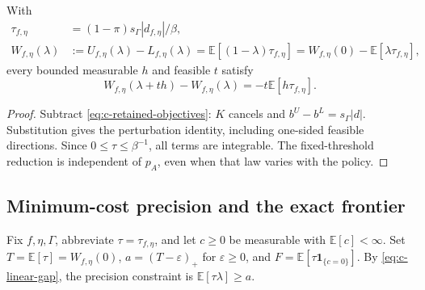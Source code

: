 \begin{proposition}\label{prop:c-tiv}
With
\begin{align}
 \tau_{f,\eta}&=(1-\pi)s_\Gamma|d_{f,\eta}|/\beta,
 \label{eq:c-tiv}\\
 W_{f,\eta}(\lambda)&:=U_{f,\eta}(\lambda)-L_{f,\eta}(\lambda)
 =\mathbb E[(1-\lambda)\tau_{f,\eta}]
 =W_{f,\eta}(0)-\mathbb E[\lambda\tau_{f,\eta}],
 \label{eq:c-linear-gap}
\end{align}
every bounded measurable $h$ and feasible $t$ satisfy
\begin{equation}
 W_{f,\eta}(\lambda+th)-W_{f,\eta}(\lambda)
 =-t\mathbb E[h\tau_{f,\eta}].\label{eq:c-feasible-derivative}
\end{equation}
\end{proposition}
\begin{proof}
Subtract \eqref{eq:c-retained-objectives}: $K$ cancels and
$b^U-b^L=s_\Gamma|d|$. Substitution gives the perturbation identity, including
one-sided feasible directions. Since $0\leq\tau\leq\beta^{-1}$, all terms are
integrable. The fixed-threshold reduction is independent of $p_A$, even when
that law varies with the policy.
\end{proof}

\subsection{Minimum-cost precision and the exact frontier}
\label{app:frontier}
Fix $f,\eta,\Gamma$, abbreviate $\tau=\tau_{f,\eta}$, and let $c\geq0$ be
measurable with $\mathbb E[c]<\infty$. Set $T=\mathbb E[\tau]=W_{f,\eta}(0)$,
$a=(T-\varepsilon)_+$ for $\varepsilon\geq0$, and
$F=\mathbb E[\tau\mathbf1_{\{c=0\}}]$. By \eqref{eq:c-linear-gap}, the
precision constraint is $\mathbb E[\tau\lambda]\geq a$.

